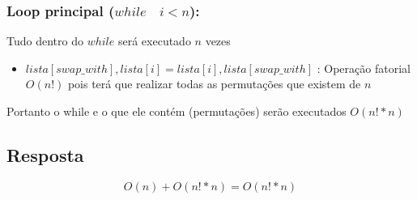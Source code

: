 \documentclass{article}
\begin{document}
\subsubsection{Loop principal ($ while \quad i < n $):}

Tudo dentro do $ while $ será executado $ n $ vezes

\begin{itemize}
    \item $lista[swap\_with], lista[i] = lista[i], lista[swap\_with]$ : Operação fatorial $ O(n!)$ 
    pois terá que realizar todas as permutações que existem de $ n $
\end{itemize}
Portanto o while e o que ele contém (permutações) serão executados $O(n!*n)$

\subsection {Resposta}

\[ O(n)  + O(n!*n) = O(n!*n)\]
\end{document}
